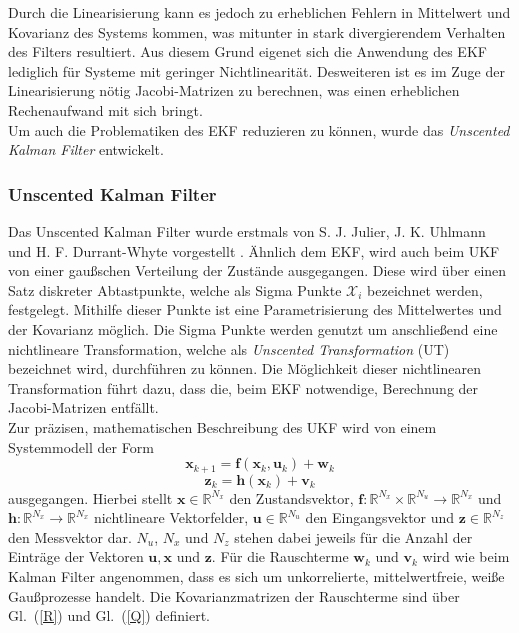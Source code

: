 Durch die Linearisierung kann es jedoch zu erheblichen Fehlern in Mittelwert und Kovarianz des Systems kommen, was mitunter in stark divergierendem Verhalten des Filters resultiert. Aus diesem Grund eigenet sich die Anwendung des EKF lediglich für Systeme mit geringer Nichtlinearität.
Desweiteren ist es im Zuge der Linearisierung nötig Jacobi-Matrizen zu berechnen, was einen erheblichen Rechenaufwand mit sich bringt. \cite{P36}
\\Um auch die Problematiken des EKF reduzieren zu können, wurde das \textit{Unscented Kalman Filter} entwickelt.

\subsubsection{Unscented Kalman Filter}
Das Unscented Kalman Filter wurde erstmals von S. J. Julier, J. K. Uhlmann und H. F. Durrant-Whyte vorgestellt \cite{P3,P3-2}. Ähnlich dem EKF, wird auch beim UKF von einer gaußschen Verteilung der Zustände ausgegangen. Diese wird über einen Satz diskreter Abtastpunkte, welche als Sigma Punkte $\mathbf{\mathcal{X}}_i$ bezeichnet werden, festgelegt. Mithilfe dieser Punkte ist eine Parametrisierung des Mittelwertes und der Kovarianz möglich. Die Sigma Punkte werden genutzt um anschließend eine nichtlineare Transformation, welche als \textit{Unscented Transformation} (UT) bezeichnet wird, durchführen zu können. Die Möglichkeit dieser nichtlinearen Transformation führt dazu, dass die, beim EKF notwendige, Berechnung der Jacobi-Matrizen entfällt. \cite{P36}
\\Zur präzisen, mathematischen Beschreibung des UKF wird von einem  Systemmodell der Form
\begin{equation}\label{sysmodell_xk+1}
  \mathbf{x}_{k+1} = \mathbf{f}(\mathbf{x}_k,\mathbf{u}_k) + \mathbf{w}_k
\end{equation}
\begin{equation}\label{sysmodell_zk}
  \mathbf{z}_{k} = \mathbf{h}(\mathbf{x}_k) + \mathbf{v}_k
\end{equation}
ausgegangen. Hierbei stellt $\mathbf{x} \in \mathbb{R}^{N_x}$ den Zustandsvektor, $\mathbf{f} : \mathbb{R}^{N_x} \times \mathbb{R}^{N_u} \to \mathbb{R}^{N_x}$ und $\mathbf{h} : \mathbb{R}^{N_x} \to \mathbb{R}^{N_x}$ nichtlineare Vektorfelder,
$\mathbf{u} \in \mathbb{R}^{N_u}$ den Eingangsvektor und $\mathbf{z} \in \mathbb{R}^{N_z}$ den Messvektor dar. $N_u$, $N_x$ und $N_z$ stehen dabei jeweils für die Anzahl der Einträge der Vektoren $\mathbf{u,x}$ und $\mathbf{z}$.
Für die Rauschterme $\mathbf{w}_k$ und $\mathbf{v}_k$ wird wie beim Kalman Filter angenommen, dass es sich um unkorrelierte, mittelwertfreie, weiße Gaußprozesse handelt. Die Kovarianzmatrizen der Rauschterme sind über Gl.~(\ref{R}) und Gl.~(\ref{Q}) definiert.
